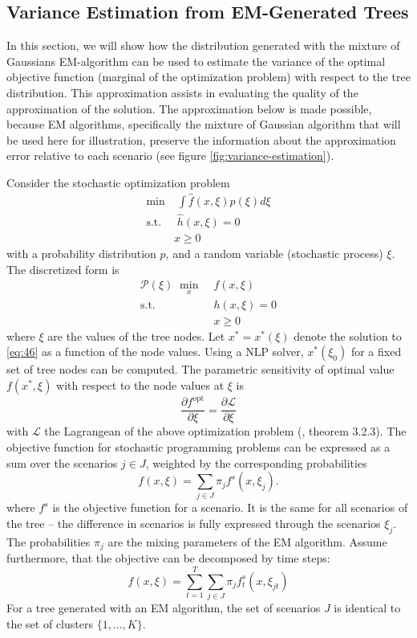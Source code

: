 \subsection{Variance Estimation from EM-Generated Trees}
\label{sec:variance-estimation}
In this section, we will show how the distribution generated with the mixture of Gaussians EM-algorithm can be used to estimate the variance of the optimal objective function (marginal of the optimization problem) with respect to the tree distribution.
This approximation assists in evaluating the quality of the approximation of the solution.
The approximation below is made possible, because EM algorithms, specifically the mixture of Gaussian algorithm that will be used here for illustration, preserve the information about the approximation error relative to each scenario (see figure \ref{fig:variance-estimation}).

Consider the stochastic optimization problem
\begin{align}
  \label{eq:49}
  \min&\;\int \hat{f}(x,\xi) p(\xi)d\xi\\
\text{s.t.}&\; \hat{h}(x,\xi) = 0\\
&x\geq 0
\end{align}
with a probability distribution $p$, and a random variable (stochastic process) $\xi$.
The discretized form is
\begin{align}
  \label{eq:46}
  \mathcal{P}(\xi)\; \min\limits_{x}&\; f(x,\xi)\\
\text{s.t.}&\; h(x,\xi) = 0\\
&\; x \geq 0
\end{align}
where $\xi$ are the values of the tree nodes.
Let $x^*=x^*(\xi)$ denote the solution to \eqref{eq:46} as a function of the node values.
Using a NLP solver, $x^*(\xi_0)$ for a fixed set of tree nodes can be computed.
The parametric sensitivity of optimal value $f(x^*,\xi)$ with respect to the node values at $\xi$ is
\begin{equation}
  \label{eq:47}
  \frac{\partial f^{\mathrm{opt}}}{\partial \xi} =  \frac{\partial \mathcal{L}}{\partial \xi}
\end{equation}
with $\mathcal{L}$ the Lagrangean of the above optimization problem (\cite{Jongen2004}, theorem 3.2.3).
The objective function for stochastic programming problems can be expressed as a sum over the scenarios $j\in J$, weighted by the corresponding probabilities
\begin{equation}
  \label{eq:45}
  f(x,\xi) = \sum_{j\in J} \pi_jf^s(x,\xi_j).
\end{equation}
where $f^s$ is the objective function for a scenario.
It is the same for all scenarios of the tree -- the difference in scenarios is fully expressed through the scenarios $\xi_j$.
The probabilities $\pi_j$ are the mixing parameters of the EM algorithm.
Assume furthermore, that the objective can be decomposed by time steps:
\begin{equation}
  \label{eq:48}
  f(x,\xi) = \sum_{t=1}^T\sum_{j\in J}\pi_jf_{t}^s(x,\xi_{jt})
\end{equation}
For a tree generated with an EM algorithm, the set of scenarios $J$ is identical to the set of clusters $\{1,\ldots,K\}$.


